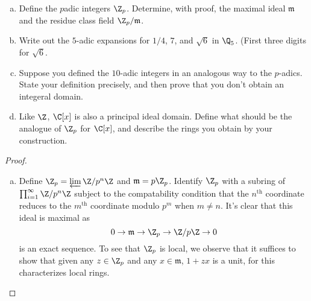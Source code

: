 \documentclass[10pt]{amsart}
\begin{document}
\begin{thm}\label{Ex3}
	\begin{enumerate}[(a)]
		\item
		Define the $p$adic integers $\Z_p$.
		Determine, with proof, the maximal ideal $\mathfrak{m}$ and the residue class field $\Z_p/\mathfrak{m}$.
		\item
		Write out the $5$-adic expansions for $1/4$, $7$, and $\sqrt{6}$ in $\Q_5$. (First three digits for $\sqrt{6}$.
		\item
		Suppose you defined the $10$-adic integers in an analogous way to the $p$-adics.
		State your definition precisely, and then prove that you don't obtain an integeral domain.
		\item
		Like $\Z$, $\C[x]$ is also a principal ideal domain.
		Define what should be the analogue of $\Z_p$ for $\C[x]$, and describe the rings you obtain by your construction.
	\end{enumerate}
		
		\begin{proof}
		\begin{enumerate}[(a)]
		\item
		Define $\Z_p = \varprojlim{\Z/p^n\Z}$ and $\mathfrak{m} = p\Z_p$.
		Identify $\Z_p$ with a subring of $\prod_{i=1}^\infty \Z/p^n\Z$ subject to the compatability condition that the $n^\text{th}$ coordinate reduces to the $m^\text{th}$ coordinate modulo $p^m$ when $m \neq n$.
		It's clear that this ideal is maximal as
		$$0 \rightarrow \mathfrak{m} \rightarrow \Z_p \rightarrow \Z/p\Z \rightarrow 0$$
		is an exact sequence.
		To see that $\Z_p$ is local, we observe that it suffices to show that given any $z \in \Z_p$ and any $x \in \mathfrak{m}$, $1 + zx$ is a unit, for this characterizes local rings.
		

\end{enumerate}
\end{proof}
\end{thm}
\end{document}
